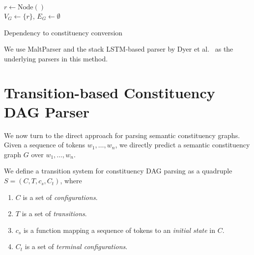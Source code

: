 \documentclass[11pt]{article}
\begin{document}
\begin{algorithm}
 $r \leftarrow \mathrm{Node()}$\\
 $V_G \leftarrow \{r\}$,
 $E_G \leftarrow \emptyset$\\
 \caption{Dependency to constituency conversion}
 \label{alg:dep2con}
\end{algorithm}

We use MaltParser \cite{nivre2007maltparser} and the stack LSTM-based parser by Dyer et al.~ as the underlying parsers in this method.

\section{Transition-based Constituency DAG Parser}\label{sec:direct_approach}

We now turn to the direct approach for parsing semantic constituency graphs. Given a sequence of tokens $w_1, \ldots, w_n$, we directly predict a semantic constituency graph $G$ over $w_1, \ldots, w_n$.

We define a transition system for constituency DAG parsing as a quadruple $S=(C,T,c_s,C_t)$, where
\begin{enumerate}
 \item $C$ is a set of \textit{configurations}.
 \item $T$ is a set of \textit{transitions}.
 \item $c_s$ is a function mapping a sequence of tokens to an \textit{initial state} in $C$.
 \item $C_t$ is a set of \textit{terminal configurations}.
\end{enumerate}
\end{document}

